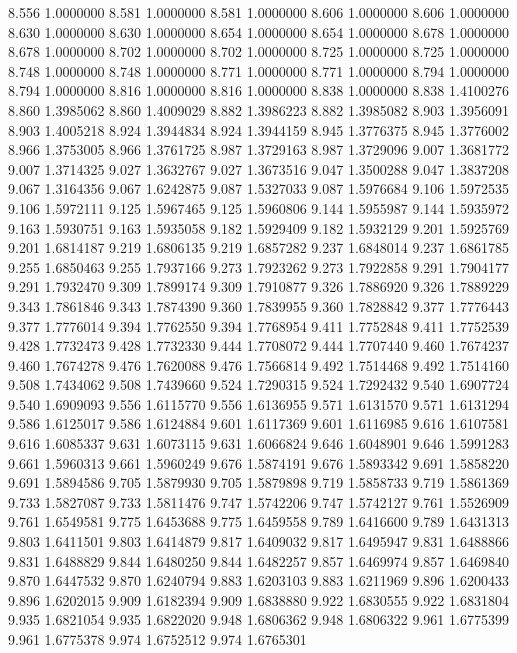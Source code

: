 8.556 1.0000000
8.581 1.0000000
8.581 1.0000000
8.606 1.0000000
8.606 1.0000000
8.630 1.0000000
8.630 1.0000000
8.654 1.0000000
8.654 1.0000000
8.678 1.0000000
8.678 1.0000000
8.702 1.0000000
8.702 1.0000000
8.725 1.0000000
8.725 1.0000000
8.748 1.0000000
8.748 1.0000000
8.771 1.0000000
8.771 1.0000000
8.794 1.0000000
8.794 1.0000000
8.816 1.0000000
8.816 1.0000000
8.838 1.0000000
8.838 1.4100276
8.860 1.3985062
8.860 1.4009029
8.882 1.3986223
8.882 1.3985082
8.903 1.3956091
8.903 1.4005218
8.924 1.3944834
8.924 1.3944159
8.945 1.3776375
8.945 1.3776002
8.966 1.3753005
8.966 1.3761725
8.987 1.3729163
8.987 1.3729096
9.007 1.3681772
9.007 1.3714325
9.027 1.3632767
9.027 1.3673516
9.047 1.3500288
9.047 1.3837208
9.067 1.3164356
9.067 1.6242875
9.087 1.5327033
9.087 1.5976684
9.106 1.5972535
9.106 1.5972111
9.125 1.5967465
9.125 1.5960806
9.144 1.5955987
9.144 1.5935972
9.163 1.5930751
9.163 1.5935058
9.182 1.5929409
9.182 1.5932129
9.201 1.5925769
9.201 1.6814187
9.219 1.6806135
9.219 1.6857282
9.237 1.6848014
9.237 1.6861785
9.255 1.6850463
9.255 1.7937166
9.273 1.7923262
9.273 1.7922858
9.291 1.7904177
9.291 1.7932470
9.309 1.7899174
9.309 1.7910877
9.326 1.7886920
9.326 1.7889229
9.343 1.7861846
9.343 1.7874390
9.360 1.7839955
9.360 1.7828842
9.377 1.7776443
9.377 1.7776014
9.394 1.7762550
9.394 1.7768954
9.411 1.7752848
9.411 1.7752539
9.428 1.7732473
9.428 1.7732330
9.444 1.7708072
9.444 1.7707440
9.460 1.7674237
9.460 1.7674278
9.476 1.7620088
9.476 1.7566814
9.492 1.7514468
9.492 1.7514160
9.508 1.7434062
9.508 1.7439660
9.524 1.7290315
9.524 1.7292432
9.540 1.6907724
9.540 1.6909093
9.556 1.6115770
9.556 1.6136955
9.571 1.6131570
9.571 1.6131294
9.586 1.6125017
9.586 1.6124884
9.601 1.6117369
9.601 1.6116985
9.616 1.6107581
9.616 1.6085337
9.631 1.6073115
9.631 1.6066824
9.646 1.6048901
9.646 1.5991283
9.661 1.5960313
9.661 1.5960249
9.676 1.5874191
9.676 1.5893342
9.691 1.5858220
9.691 1.5894586
9.705 1.5879930
9.705 1.5879898
9.719 1.5858733
9.719 1.5861369
9.733 1.5827087
9.733 1.5811476
9.747 1.5742206
9.747 1.5742127
9.761 1.5526909
9.761 1.6549581
9.775 1.6453688
9.775 1.6459558
9.789 1.6416600
9.789 1.6431313
9.803 1.6411501
9.803 1.6414879
9.817 1.6409032
9.817 1.6495947
9.831 1.6488866
9.831 1.6488829
9.844 1.6480250
9.844 1.6482257
9.857 1.6469974
9.857 1.6469840
9.870 1.6447532
9.870 1.6240794
9.883 1.6203103
9.883 1.6211969
9.896 1.6200433
9.896 1.6202015
9.909 1.6182394
9.909 1.6838880
9.922 1.6830555
9.922 1.6831804
9.935 1.6821054
9.935 1.6822020
9.948 1.6806362
9.948 1.6806322
9.961 1.6775399
9.961 1.6775378
9.974 1.6752512
9.974 1.6765301
